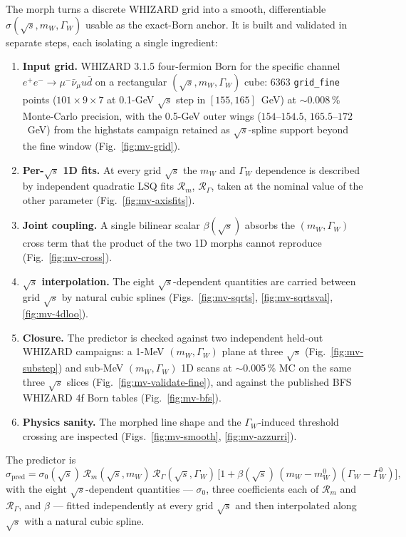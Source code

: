 \documentclass[11pt,a4paper]{article}
\newcommand{\mW}{m_W}
\newcommand{\GammaW}{\Gamma_W}
\newcommand{\sqrts}{\sqrt{s}}
\newcommand{\munuqq}{\mu^-\bar\nu_\mu u\bar d}
\begin{document}
The morph turns a discrete WHIZARD grid into a smooth, differentiable
$\sigma(\sqrts,\mW,\GammaW)$ usable as the exact-Born anchor. It is
built and validated in separate steps, each isolating a single
ingredient:
\begin{enumerate}
\item \textbf{Input grid.} WHIZARD 3.1.5 four-fermion Born for the
specific channel $e^+e^-\!\to\!\munuqq$ on a rectangular
$(\sqrts,\mW,\GammaW)$ cube: 6363 \texttt{grid\_fine} points
($101\times9\times7$ at 0.1-GeV $\sqrts$ step in $[155, 165]$~GeV) at
$\sim$0.008\,\% Monte-Carlo precision, with the 0.5-GeV outer wings
($154$–$154.5$, $165.5$–$172$~GeV) from the highstats campaign retained
as $\sqrts$-spline support beyond the fine window
(Fig.~\ref{fig:mv-grid}).
\item \textbf{Per-$\sqrts$ 1D fits.} At every grid $\sqrts$ the $\mW$
and $\GammaW$ dependence is described by independent quadratic LSQ
fits $\mathcal{R}_m$, $\mathcal{R}_\Gamma$, taken at the nominal value
of the other parameter (Fig.~\ref{fig:mv-axisfits}).
\item \textbf{Joint coupling.} A single bilinear scalar $\beta(\sqrts)$
absorbs the $(\mW,\GammaW)$ cross term that the product of the two 1D
morphs cannot reproduce (Fig.~\ref{fig:mv-cross}).
\item \textbf{$\sqrts$ interpolation.} The eight $\sqrts$-dependent
quantities are carried between grid $\sqrts$ by natural cubic splines
(Figs.~\ref{fig:mv-sqrts}, \ref{fig:mv-sqrtsval}, \ref{fig:mv-4dloo}).
\item \textbf{Closure.} The predictor is checked against two
independent held-out WHIZARD campaigns: a 1-MeV $(\mW,\GammaW)$ plane
at three $\sqrts$ (Fig.~\ref{fig:mv-substep}) and sub-MeV
$(\mW,\GammaW)$ 1D scans at $\sim$0.005\,\% MC on the same three
$\sqrts$ slices (Fig.~\ref{fig:mv-validate-fine}), and against the
published BFS WHIZARD 4f Born tables (Fig.~\ref{fig:mv-bfs}).
\item \textbf{Physics sanity.} The morphed line shape and the
$\GammaW$-induced threshold crossing are inspected
(Figs.~\ref{fig:mv-smooth}, \ref{fig:mv-azzurri}).
\end{enumerate}

The predictor is
\begin{equation*}
\sigma_\text{pred}=\sigma_0(\sqrts)\,
\mathcal{R}_m(\sqrts,\mW)\,
\mathcal{R}_\Gamma(\sqrts,\GammaW)\,
\bigl[1+\beta(\sqrts)\,(\mW-\mW^0)(\GammaW-\GammaW^0)\bigr],
\end{equation*}
with the eight $\sqrts$-dependent quantities --- $\sigma_0$, three
coefficients each of $\mathcal{R}_m$ and $\mathcal{R}_\Gamma$, and
$\beta$ --- fitted independently at every grid $\sqrts$ and then
interpolated along $\sqrts$ with a natural cubic spline.
\end{document}
